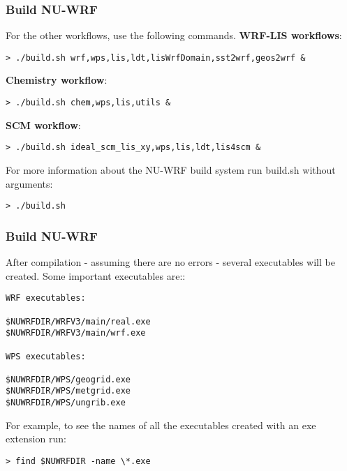 \begin{frame}[fragile]\frametitle{Build NU-WRF}

\scriptsize{
For the other workflows, use the following commands.
\bigbreak
\textbf{WRF-LIS workflows}:
\begin{lstlisting}
> ./build.sh wrf,wps,lis,ldt,lisWrfDomain,sst2wrf,geos2wrf &
\end{lstlisting}
\textbf{Chemistry workflow}:
\begin{lstlisting}
> ./build.sh chem,wps,lis,utils &
\end{lstlisting}
\textbf{SCM workflow}:
\begin{lstlisting}
> ./build.sh ideal_scm_lis_xy,wps,lis,ldt,lis4scm &
\end{lstlisting}
For more information about the NU-WRF build system run build.sh without arguments:
\begin{lstlisting}
> ./build.sh
\end{lstlisting}
}
\end{frame}


\begin{frame}[fragile]\frametitle{Build NU-WRF}

After compilation - assuming there are no errors - several executables will be created. Some important executables are::
\begin{lstlisting}
WRF executables:

$NUWRFDIR/WRFV3/main/real.exe
$NUWRFDIR/WRFV3/main/wrf.exe

WPS executables:

$NUWRFDIR/WPS/geogrid.exe
$NUWRFDIR/WPS/metgrid.exe
$NUWRFDIR/WPS/ungrib.exe

\end{lstlisting}
For example, to see the names of all the executables created with an exe extension run:
\begin{lstlisting}
> find $NUWRFDIR -name \*.exe
\end{lstlisting}

\end{frame}

